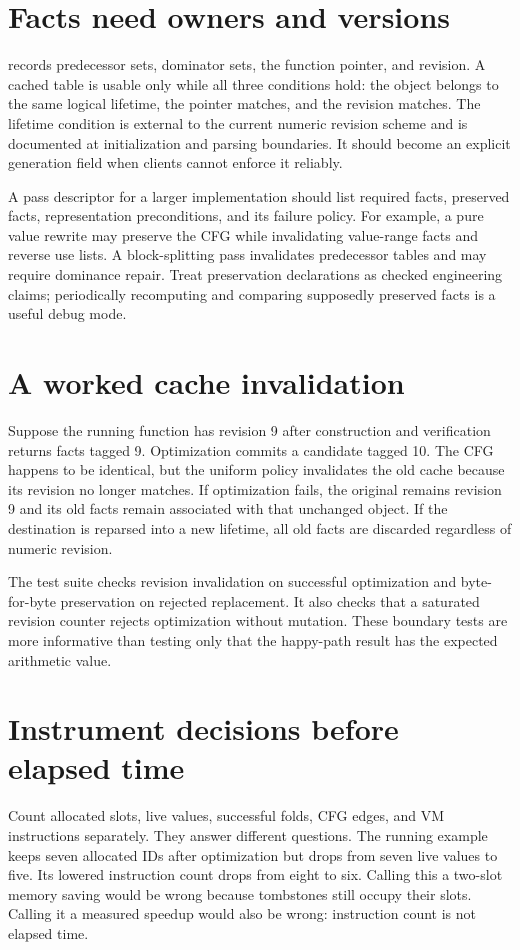 \section{Facts need owners and versions}
\label{sec:pebble-pass-facts}
 records predecessor sets, dominator sets, the function pointer, and revision.
A cached table is usable only while all three conditions hold: the object belongs to the same logical lifetime, the pointer matches, and the revision matches.
The lifetime condition is external to the current numeric revision scheme and is documented at initialization and parsing boundaries.
It should become an explicit generation field when clients cannot enforce it reliably.

A pass descriptor for a larger implementation should list required facts, preserved facts, representation preconditions, and its failure policy.
For example, a pure value rewrite may preserve the CFG while invalidating value-range facts and reverse use lists.
A block-splitting pass invalidates predecessor tables and may require dominance repair.
Treat preservation declarations as checked engineering claims; periodically recomputing and comparing supposedly preserved facts is a useful debug mode.

\section{A worked cache invalidation}
\label{sec:pebble-pass-worked}
Suppose the running function has revision 9 after construction and verification returns facts tagged 9.
Optimization commits a candidate tagged 10.
The CFG happens to be identical, but the uniform policy invalidates the old cache because its revision no longer matches.
If optimization fails, the original remains revision 9 and its old facts remain associated with that unchanged object.
If the destination is reparsed into a new lifetime, all old facts are discarded regardless of numeric revision.

The test suite checks revision invalidation on successful optimization and byte-for-byte preservation on rejected replacement.
It also checks that a saturated revision counter rejects optimization without mutation.
These boundary tests are more informative than testing only that the happy-path result has the expected arithmetic value.

\section{Instrument decisions before elapsed time}
\label{sec:pebble-pass-measures}
Count allocated slots, live values, successful folds, CFG edges, and VM instructions separately.
They answer different questions.
The running example keeps seven allocated IDs after optimization but drops from seven live values to five.
Its lowered instruction count drops from eight to six.
Calling this a two-slot memory saving would be wrong because tombstones still occupy their slots.
Calling it a measured speedup would also be wrong: instruction count is not elapsed time.

